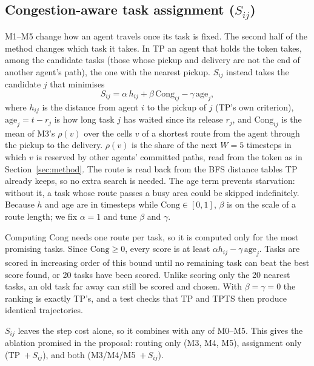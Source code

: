 
\subsection{Congestion-aware task assignment ($S_{ij}$)}
\label{sec:sij}

M1--M5 change how an agent travels once its task is fixed. The second half of
the method changes which task it takes. In TP an agent that holds the token
takes, among the candidate tasks (those whose pickup and delivery are not the
end of another agent's path), the one with the nearest pickup. $S_{ij}$
instead takes the candidate $j$ that minimises
\begin{equation}
  S_{ij} = \alpha\, h_{ij} + \beta\, \mathrm{Cong}_{ij} - \gamma\, \mathrm{age}_j ,
  \label{eq:sij}
\end{equation}
where $h_{ij}$ is the distance from agent $i$ to the pickup of $j$ (TP's own
criterion), $\mathrm{age}_j = t - r_j$ is how long task $j$ has waited since
its release $r_j$, and $\mathrm{Cong}_{ij}$ is the mean of M3's
$\rho(v)$ over the cells $v$ of a shortest route from the agent through the
pickup to the delivery. $\rho(v)$ is the share of the next $W=5$ timesteps in
which $v$ is reserved by other agents' committed paths, read from the token
as in Section~\ref{sec:method}. The route is read back from the BFS distance
tables TP already keeps, so no extra search is needed. The age term prevents
starvation: without it, a task whose route passes a busy area could be
skipped indefinitely. Because $h$ and age are in timesteps while
$\mathrm{Cong}\in[0,1]$, $\beta$ is on the scale of a route length; we fix
$\alpha=1$ and tune $\beta$ and $\gamma$.

Computing $\mathrm{Cong}$ needs one route per task, so it is computed only for
the most promising tasks. Since $\mathrm{Cong}\ge 0$, every score is at least
$\alpha h_{ij} - \gamma\,\mathrm{age}_j$. Tasks are scored in increasing order
of this bound until no remaining task can beat the best score found, or 20
tasks have been scored. Unlike scoring only the 20 nearest tasks, an old task
far away can still be scored and chosen. With $\beta=\gamma=0$ the ranking is
exactly TP's, and a test checks that TP and TPTS then produce identical
trajectories.

$S_{ij}$ leaves the step cost alone, so it combines with any of M0--M5. This
gives the ablation promised in the proposal: routing only (M3, M4, M5),
assignment only (TP~$+\,S_{ij}$), and both (M3/M4/M5~$+\,S_{ij}$).
